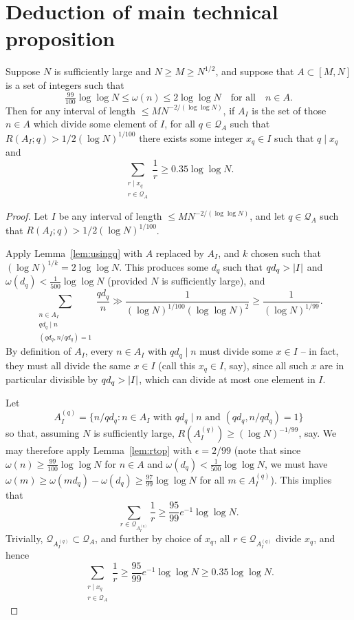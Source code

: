 \chapter{Deduction of main technical proposition}
\label{chap:techprop}


\begin{lemma}\label{lem:find_multiples}
Suppose $N$ is sufficiently large and $N\geq M\geq N^{1/2}$, and suppose that $A\subset [M,N]$ is a set of integers such that
\[\tfrac{99}{100}\log\log N\leq \omega(n)\leq  2\log\log N\quad\textrm{for all}\quad n\in A.\]
Then for any interval of length $\leq MN^{-2/(\log \log N)}$, if $A_I$ is the set of those $n\in A$ which divide some element of $I$, for all $q\in\mathcal{Q}_A$ such that $R(A_I;q)> 1/2(\log N)^{1/100}$ there exists some integer $x_q\in I$ such that $q\mid x_q$ and 
\[\sum_{\substack{r\mid x_q\\ r\in \mathcal{Q}_A}}\frac{1}{r}\geq 0.35\log\log N.\] 
\end{lemma}
\begin{proof}
Let $I$ be any interval of length $\leq MN^{-2/(\log\log N)}$, and let $q\in\mathcal{Q}_A$ such that $R(A_I;q)> 1/2(\log N)^{1/100}$. 

Apply Lemma~\ref{lem:usingq} with $A$ replaced by $A_I$, and $k$ chosen such that $(\log N)^{1/k}=2\log\log N$. This produces some $d_q$ such that $qd_q>\left\lvert I\right\rvert$ and $\omega(d_q)<\tfrac{1}{500}\log\log N$ (provided $N$ is sufficiently large), and
  \[\sum_{\substack{n\in A_I\\ qd_q\mid n\\ (qd_q,n/qd_q)=1}}\frac{qd_q}{n}\gg \frac{1}{(\log N)^{1/100}(\log\log N)^2}\geq \frac{1}{(\log N)^{1/99}}.\]
  By definition of $A_I$, every $n\in A_I$ with $qd_q\mid n$ must divide some $x\in I$ -- in fact, they must all divide the same $x\in I$ (call this $x_q\in I$, say), since all such $x$ are in particular divisible by $qd_q>\left\lvert I\right\rvert$, which can divide at most one element in $I$.

Let
  \[A_I^{(q)}=\{ n/qd_q : n\in A_I\textrm{ with }qd_q\mid n\textrm{ and }(qd_q,n/qd_q)=1\}\]
  so that, assuming $N$ is sufficiently large, $R(A_I^{(q)})\geq (\log N)^{-1/99}$, say. We may therefore apply Lemma~\ref{lem:rtop} with $\epsilon=2/99$ (note that since $\omega(n)\geq \frac{99}{100}\log\log N$ for $n\in A$ and $\omega(d_q)<\frac{1}{500}\log\log N$, we must have $\omega(m)\geq \omega(md_q)-\omega(d_q)\geq \frac{97}{99}\log\log N$ for all $m\in A_I^{(q)}$). This implies that
  \[\sum_{r\in \mathcal{Q}_{A_I^{(q)}}}\frac{1}{r}\geq \frac{95}{99}e^{-1}\log\log N.\]
  Trivially, $\mathcal{Q}_{A_I^{(q)}}\subset \mathcal{Q}_A$, and further by choice of $x_q$, all $r\in \mathcal{Q}_{A_I^{(q)}}$ divide $x_q$, and hence
  \[\sum_{\substack{r\mid x_q\\ r\in \mathcal{Q}_A}}\frac{1}{r}\geq \frac{95}{99}e^{-1}\log\log N\geq 0.35\log\log N.\]
\end{proof}


